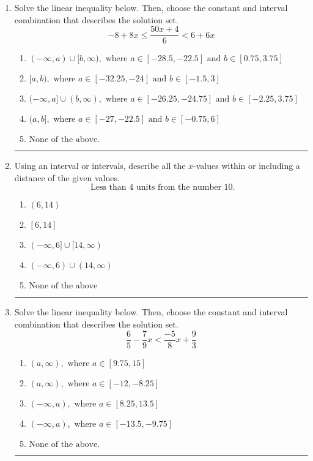 \documentclass[14pt]{extbook}
\newcommand{\litem}[1]{\item#1\hspace*{-1cm}\rule{\textwidth}{0.4pt}}
\begin{document}
\begin{enumerate}
{\begin{enumerate}[label=\Alph*.]
\end{enumerate} }
\litem{
Solve the linear inequality below. Then, choose the constant and interval combination that describes the solution set.\[ -8 + 8 x \leq \frac{50 x + 4}{6} < 6 + 6 x \]\begin{enumerate}[label=\Alph*.]
\item \( (-\infty, a) \cup [b, \infty), \text{ where } a \in [-28.5, -22.5] \text{ and } b \in [0.75, 3.75] \)
\item \( [a, b), \text{ where } a \in [-32.25, -24] \text{ and } b \in [-1.5, 3] \)
\item \( (-\infty, a] \cup (b, \infty), \text{ where } a \in [-26.25, -24.75] \text{ and } b \in [-2.25, 3.75] \)
\item \( (a, b], \text{ where } a \in [-27, -22.5] \text{ and } b \in [-0.75, 6] \)
\item \( \text{None of the above.} \)

\end{enumerate} }
\litem{
Using an interval or intervals, describe all the $x$-values within or including a distance of the given values.\[ \text{ Less than } 4 \text{ units from the number } 10. \]\begin{enumerate}[label=\Alph*.]
\item \( (6, 14) \)
\item \( [6, 14] \)
\item \( (-\infty, 6] \cup [14, \infty) \)
\item \( (-\infty, 6) \cup (14, \infty) \)
\item \( \text{None of the above} \)

\end{enumerate} }
\litem{
Solve the linear inequality below. Then, choose the constant and interval combination that describes the solution set.\[ \frac{6}{5} - \frac{7}{9} x < \frac{-5}{8} x + \frac{9}{3} \]\begin{enumerate}[label=\Alph*.]
\item \( (a, \infty), \text{ where } a \in [9.75, 15] \)
\item \( (a, \infty), \text{ where } a \in [-12, -8.25] \)
\item \( (-\infty, a), \text{ where } a \in [8.25, 13.5] \)
\item \( (-\infty, a), \text{ where } a \in [-13.5, -9.75] \)
\item \( \text{None of the above}. \)


\end{enumerate}}
\end{enumerate}
\end{document}
